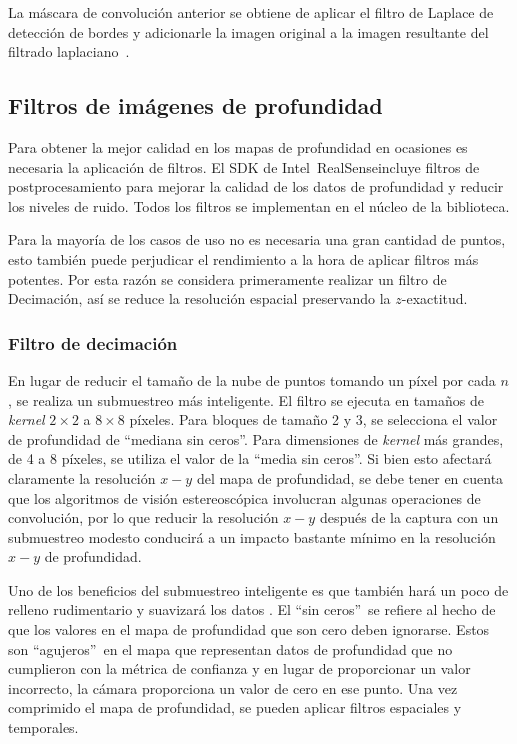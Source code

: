 La máscara de convolución anterior se obtiene de aplicar el filtro de Laplace de detección de bordes y adicionarle la imagen original a la imagen resultante del filtrado laplaciano~\cite{sharpen}.

\subsection{Filtros de imágenes de profundidad}

Para obtener la mejor calidad en los mapas de profundidad en ocasiones es necesaria la aplicación de filtros. El SDK de Intel\textregistered~RealSense\texttrademark incluye filtros de postprocesamiento para mejorar la calidad de los datos de profundidad y reducir los niveles de ruido. Todos los filtros se implementan en el núcleo de la biblioteca.

Para la mayoría de los casos de uso no es necesaria una gran cantidad de puntos, esto también puede perjudicar el rendimiento a la hora de aplicar filtros más potentes. Por esta razón se considera primeramente realizar un filtro de Decimación, así se reduce la resolución espacial preservando la $z$-exactitud.

\subsubsection{Filtro de decimación}

En lugar de reducir el tamaño de la nube de puntos tomando un píxel por cada $n$, se realiza un submuestreo más inteligente. El filtro se ejecuta en tamaños de \textit{kernel} $2 \times 2$ a $8 \times 8$ píxeles. Para bloques de tamaño 2 y 3, se selecciona el valor de profundidad  de \textquotedblleft mediana sin ceros\textquotedblright . Para dimensiones de \textit{kernel} más grandes, de 4 a 8 píxeles, se utiliza el valor de la \textquotedblleft media sin ceros\textquotedblright . Si bien esto afectará claramente la resolución $x-y$ del mapa de profundidad, se debe tener en cuenta que los algoritmos de visión estereoscópica involucran algunas operaciones de convolución, por lo que reducir la resolución $x-y$ después de la captura con un submuestreo modesto conducirá a un impacto bastante mínimo en la resolución $x-y$ de profundidad. 

Uno de los beneficios del submuestreo inteligente es que también hará un poco de relleno rudimentario y suavizará los datos . El \textquotedblleft sin ceros\textquotedblright\ se refiere al hecho de que los valores en el mapa de profundidad que son cero deben ignorarse. Estos son \textquotedblleft agujeros\textquotedblright\ en el mapa que representan datos de profundidad que no cumplieron con la métrica de confianza y en lugar de proporcionar un valor incorrecto, la cámara proporciona un valor de cero en ese punto. Una vez comprimido el mapa de profundidad, se pueden aplicar filtros espaciales y temporales.

